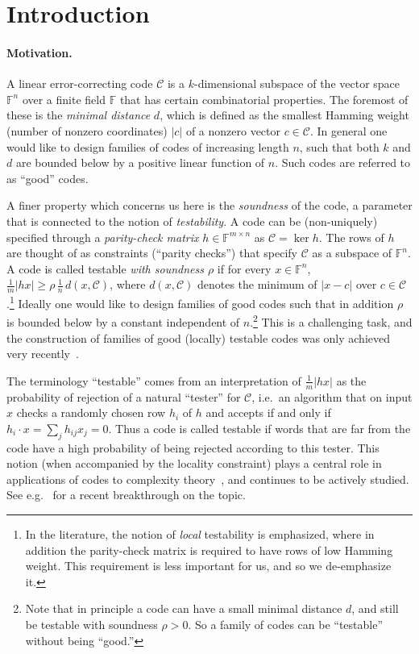 \documentclass[11pt]{article}
\theoremstyle{definition}
\newcommand{\code}{\mathscr{C}}
\newcommand{\F}{\ensuremath{\mathbb{F}}}
\begin{document}
\section{Introduction}

\paragraph{Motivation.}
A linear error-correcting code $\code$ is a $k$-dimensional subspace of the vector space $\F^n$ over a finite field $\F$ that has certain combinatorial properties. The foremost of these is the \emph{minimal distance} $d$, which is defined as the smallest Hamming weight (number of nonzero coordinates) $|c|$ of a nonzero vector  $c\in\code$. In general one would like to design families of codes of increasing length $n$, such that both $k$ and $d$ are bounded below by a positive linear function of $n$. Such codes are referred to as ``good'' codes.

A finer property which concerns us here is the \emph{soundness} of the code, a parameter that is connected to the notion of \emph{testability}. A code can be (non-uniquely) specified through a \emph{parity-check matrix} $h\in\F^{m\times n}$ as $\code = \ker h$. The rows of $h$ are thought of as constraints (``parity checks'') that specify $\code$ as a subspace of $\F^n$. A code is called testable \emph{with soundness $\rho$} if for every $x\in \F^n$, $\frac{1}{m}|hx|\geq \rho \, \frac{1}{n}\, d(x,\code)$, where $d(x,\code)$ denotes the minimum of $|x-c|$ over $c\in \code$.\footnote{In the literature, the notion of \emph{local} testability is emphasized, where in addition the parity-check matrix is required to have rows of low Hamming weight. This requirement is less important for us, and so we de-emphasize it.}  Ideally one would like to design families of good codes such that in addition $\rho$ is bounded below by a constant independent of $n$.\footnote{Note that in principle a code can have a small minimal distance $d$, and still be testable with soundness $\rho>0$. So a family of codes can be ``testable'' without being ``good.''} This is a challenging task, and the construction of families of good (locally) testable codes was only achieved very recently~\cite{LTC_DELLM,LTC_Panteleev_Kalachev}. 

The terminology ``testable'' comes from an interpretation of $\frac{1}{m}|hx|$ as the probability of rejection of a natural ``tester'' for $\code$, i.e.\ an algorithm that on input $x$ checks a randomly chosen row $h_i$ of $h$ and accepts if and only if $h_i\cdot x = \sum_j h_{ij} x_j =0$.  Thus a code is called testable if words that are far from the code have a high probability of being rejected according to this tester. This notion (when accompanied by the locality constraint) plays a central role in applications of codes to complexity theory~\cite{babai1991non,PCP_thm}, and continues to be actively studied. See e.g.~\cite{LTC_DELLM,LTC_Panteleev_Kalachev} for a recent breakthrough on the topic. 
\end{document}
